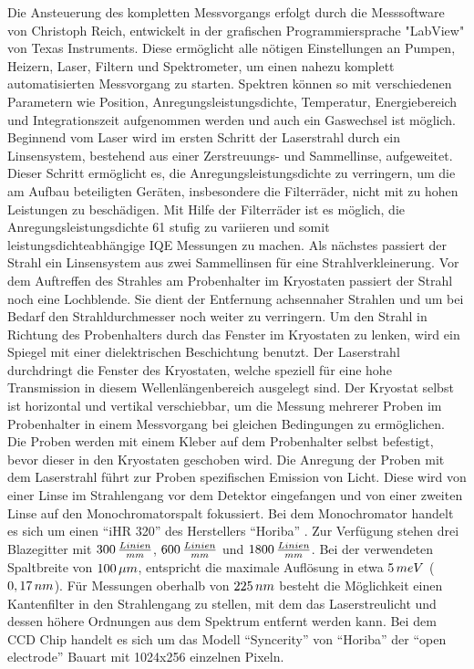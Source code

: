 Die Ansteuerung des kompletten Messvorgangs erfolgt durch die Messsoftware von Christoph Reich, entwickelt in der grafischen Programmiersprache "LabView" von Texas Instruments. Diese ermöglicht alle nötigen Einstellungen an Pumpen, Heizern, Laser, Filtern und Spektrometer, um einen nahezu komplett automatisierten Messvorgang zu starten. Spektren können so mit verschiedenen Parametern wie Position, Anregungsleistungsdichte, Temperatur, Energiebereich und Integrationszeit aufgenommen werden und auch ein Gaswechsel ist möglich.
\newline
Beginnend vom Laser wird im ersten Schritt der Laserstrahl durch ein Linsensystem, bestehend aus einer Zerstreuungs- und Sammellinse, aufgeweitet. Dieser Schritt ermöglicht es, die Anregungsleistungsdichte zu verringern, um die am Aufbau beteiligten Geräten, insbesondere die Filterräder, nicht mit zu hohen Leistungen zu beschädigen. Mit Hilfe der Filterräder ist es möglich, die Anregungsleistungsdichte 61 stufig zu variieren und somit leistungsdichteabhängige IQE Messungen zu machen. Als nächstes passiert der Strahl ein Linsensystem aus zwei Sammellinsen für eine Strahlverkleinerung. Vor dem Auftreffen des Strahles am Probenhalter im Kryostaten passiert der Strahl noch eine Lochblende. Sie dient der Entfernung achsennaher Strahlen und um bei Bedarf den Strahldurchmesser noch weiter zu verringern. 
\newline
Um den Strahl in Richtung des Probenhalters durch das Fenster im Kryostaten zu lenken, wird ein Spiegel mit einer dielektrischen Beschichtung benutzt. Der Laserstrahl durchdringt die Fenster des Kryostaten, welche speziell für eine hohe Transmission in diesem Wellenlängenbereich ausgelegt sind. Der Kryostat selbst ist horizontal und vertikal verschiebbar, um die Messung mehrerer Proben im Probenhalter in einem Messvorgang bei gleichen Bedingungen zu ermöglichen. Die Proben werden mit einem Kleber auf dem Probenhalter selbst befestigt, bevor dieser in den Kryostaten geschoben wird. 
Die Anregung der Proben mit dem Laserstrahl führt zur Proben spezifischen Emission von Licht. Diese wird von einer Linse im Strahlengang vor dem Detektor eingefangen und von einer zweiten Linse auf den Monochromatorspalt fokussiert.
\newline
Bei dem Monochromator handelt es sich um einen "`iHR 320"' des Herstellers "`Horiba"' . Zur Verfügung stehen drei Blazegitter mit $300 \thinspace \frac{Linien}{mm}$,
$600 \thinspace \frac{Linien}{mm}$ und $1800 \thinspace \frac{Linien}{mm}$. Bei der verwendeten Spaltbreite von $100 \thinspace \mu m$, entspricht die maximale Auflösung in etwa $5 \thinspace meV$ ($0,17 \thinspace nm$). Für Messungen oberhalb von $225 \thinspace nm$ besteht die Möglichkeit einen Kantenfilter in den Strahlengang zu stellen, mit dem das Laserstreulicht und dessen höhere Ordnungen aus dem Spektrum entfernt werden kann. Bei dem CCD Chip handelt es sich um das Modell "`Syncerity"' von "`Horiba"' der "`open electrode"' Bauart mit 1024x256 einzelnen Pixeln. 

